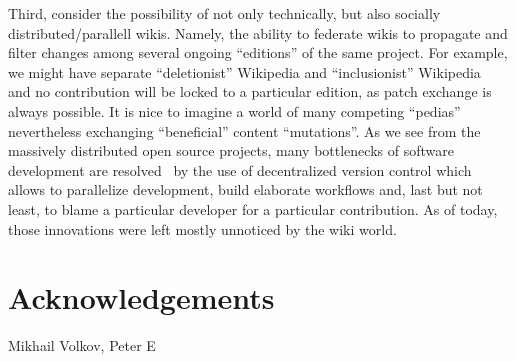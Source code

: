 \documentclass[twocolumn]{article}
\begin{document}
Third, consider the possibility of not only technically, but also socially distributed/parallell wikis. Namely, the ability to federate wikis to propagate and filter changes among several ongoing ``editions'' of the same project. For example, we might have separate ``deletionist'' Wikipedia and ``inclusionist'' Wikipedia~\cite{delinc} and no contribution will be locked to a particular edition, as patch exchange is always possible. It is nice to imagine a world of many competing ``pedias'' nevertheless exchanging ``beneficial'' content ``mutations''. As we see from the massively distributed open source projects, many bottlenecks of software development are resolved~\cite{git} by the use of decentralized version control which allows to parallelize development, build elaborate workflows and, last but not least, to blame a particular developer for a particular contribution. As of today, those innovations were left mostly unnoticed by the wiki world.

\section{Acknowledgements}

Mikhail Volkov, Peter E
\end{document}
